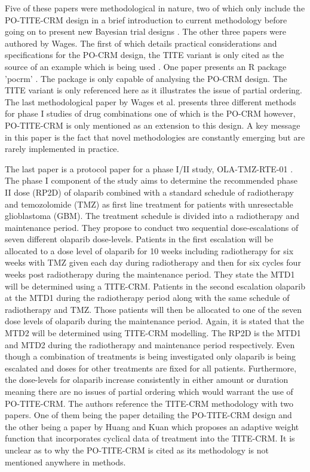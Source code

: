 Five of these papers were methodological in nature, two of which only include the PO-TITE-CRM design in a brief introduction to current methodology before going on to present new Bayesian trial designs \cite{liuBAYESIANDATAAUGMENTATION2013, wheelerBayesianModelfreeApproach2019}. The other three papers were authored by Wages. The first of which details practical considerations and specifications for the PO-CRM design, the TITE variant is only cited as the source of an example which is being used \cite{wagesSpecificationsContinualReassessment2013}. One paper presents an R package 'pocrm' \cite{wagesPocrmRpackagePhase2013, wagesPocrmDoseFinding2019}. The package is only capable of analysing the PO-CRM design. The TITE variant is only referenced here as it illustrates the issue of partial ordering. The last methodological paper by Wages et al. \cite{wagesPracticalDesignsPhase2016} presents three different methods for phase \RN{1} studies of drug combinations one of which is the PO-CRM however, PO-TITE-CRM is only mentioned as an extension to this design. A key message in this paper is the fact that novel methodologies are constantly emerging but are rarely implemented in practice. 

The last paper is a protocol paper for a phase \RN{1}/\RN{2} study, OLA-TMZ-RTE-01 \cite{lesueurPhaseIIaStudy2019}. The phase \RN{1} component of the study aims to determine the recommended phase \RN{2} dose (RP2D) of olaparib combined with a standard schedule of radiotherapy and temozolomide (TMZ) as first line treatment for patients with unresectable glioblastoma (GBM). The treatment schedule is divided into a radiotherapy and maintenance period. They propose to conduct two sequential dose-escalations of seven different  olaparib dose-levels. Patients in the first escalation will be allocated to a dose level of olaparib for 10 weeks including radiotherapy for six weeks with TMZ given each day during radiotherapy and then for six cycles four weeks post radiotherapy during the maintenance period. They state the MTD1 will be determined using a TITE-CRM. Patients in the second escalation olaparib at the MTD1 during the radiotherapy period along with the same schedule of radiotherapy and TMZ. Those patients will then be allocated to one of the seven dose levels of olaparib during the maintenance period. Again, it is stated that the MTD2 will be determined using TITE-CRM modelling. The RP2D is the MTD1 and MTD2 during the radiotherapy and maintenance period respectively. Even though a combination of treatments is being investigated only olaparib is being escalated and doses for other treatments are fixed for all patients. Furthermore, the dose-levels for olaparib increase consistently in either amount or duration meaning there are no issues of partial ordering which would warrant the use of PO-TITE-CRM. The authors reference the TITE-CRM methodology with two papers. One of them being the paper detailing the PO-TITE-CRM design and the other being a paper by Huang and Kuan \cite{huangTimetoeventContinualReassessment2014} which proposes an adaptive weight function that incorporates cyclical data of treatment into the TITE-CRM. It is unclear as to why the PO-TITE-CRM is cited as its methodology is not mentioned anywhere in methods.       

